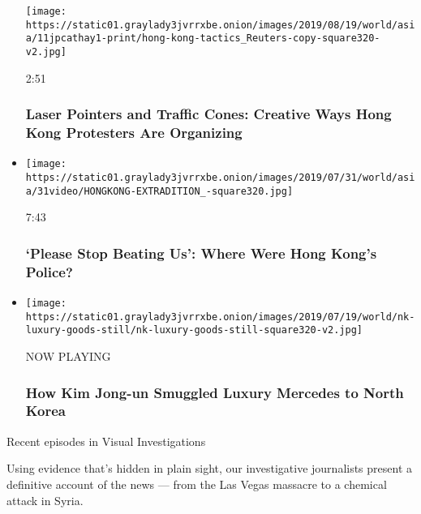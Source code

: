\begin{itemize}
  \texttt{[image: https://static01.graylady3jvrrxbe.onion/images/2019/08/19/world/asia/11jpcathay1-print/hong-kong-tactics\_Reuters-copy-square320-v2.jpg]}

  2:51

  \hypertarget{laser-pointers-and-traffic-cones-creative-ways-hong-kong-protesters-are-organizing}{%
  \subsubsection{Laser Pointers and Traffic Cones: Creative Ways Hong
  Kong Protesters Are
  Organizing}\label{laser-pointers-and-traffic-cones-creative-ways-hong-kong-protesters-are-organizing}}
\item
  \href{https://www.nytimes3xbfgragh.onion/video/world/asia/100000006624535/hong-kong-protest-police-triad-investigation.html?action=click\&module=video-series-bar\&region=header\&pgtype=Article\&playlistId=video/investigations}{}

  \texttt{[image: https://static01.graylady3jvrrxbe.onion/images/2019/07/31/world/asia/31video/HONGKONG-EXTRADITION\_-square320.jpg]}

  7:43

  \hypertarget{please-stop-beating-us-where-were-hong-kongs-police}{%
  \subsubsection{`Please Stop Beating Us': Where Were Hong Kong's
  Police?}\label{please-stop-beating-us-where-were-hong-kongs-police}}
\item
  \texttt{[image: https://static01.graylady3jvrrxbe.onion/images/2019/07/19/world/nk-luxury-goods-still/nk-luxury-goods-still-square320-v2.jpg]}

  NOW PLAYING

  \hypertarget{how-kim-jong-un-smuggled-luxury-mercedes-to-north-korea-2}{%
  \subsubsection{How Kim Jong-un Smuggled Luxury Mercedes to North
  Korea}\label{how-kim-jong-un-smuggled-luxury-mercedes-to-north-korea-2}}
\end{itemize}

Recent episodes in Visual Investigations

Using evidence that's hidden in plain sight, our investigative
journalists present a definitive account of the news --- from the Las
Vegas massacre to a chemical attack in Syria.

